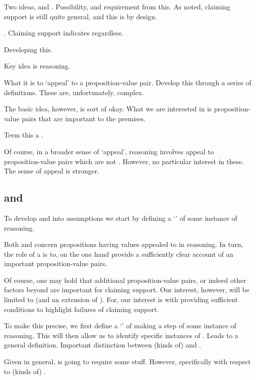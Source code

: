 \begin{note}
  Two ideas, \ideaS{} and \ideaCS{}.
  Possibility, and requirement from this.
  As noted, claiming support is still quite general, and this is by design.
\end{note}

\begin{note}
  \ideaCS{}.
  Claiming support indicates regardless.

  Developing this.

  Key idea is reasoning.

  What it is to `appeal' to a proposition-value pair.
  Develop this through a series of definitions.
  These are, unfortunately, complex.

  The basic idea, however, is sort of okay.
  What we are interested in is proposition-value pairs that are important to the premises.

  Term this a \requ{}.

  Of course, in a broader sense of `appeal', reasoning involves appeal to proposition-value pairs which are not .
  However, no particular interest in these.
  The sense of appeal is stronger.
\end{note}

\subsection{ and }
\label{sec:claim-supp-requ}

\begin{note}
  To develop \ideaS{} and \ideaCS{} into assumptions we start by defining a `\requ{}' of some instance of reasoning.

  Both \ideaS{} and \ideaCS{} concern propositions having values appealed to in reasoning.
  In turn, the role of a \requ{} is to, on the one hand provide a sufficiently clear account of an important proposition-value pairs.

  Of course, one may hold that additional proposition-value pairs, or indeed other factors beyond  are important for claiming support.
  Our interest, however, will be limited to  (and an extension of ).
  For, our interest is with providing sufficient conditions to highlight failures of claiming support.
\end{note}



\begin{note}
  To make this precise, we first define a `\result{}' of making a step of some instance of reasoning.
  This will then allow us to identify specific instances of .
  Leads to a general definition.
  Important distinction between (kinds of)  and .

  Given \requ{} in general, \ideaCS{} is going to require some stuff.
  However, specifically with respect to (kinds of) .
\end{note}

